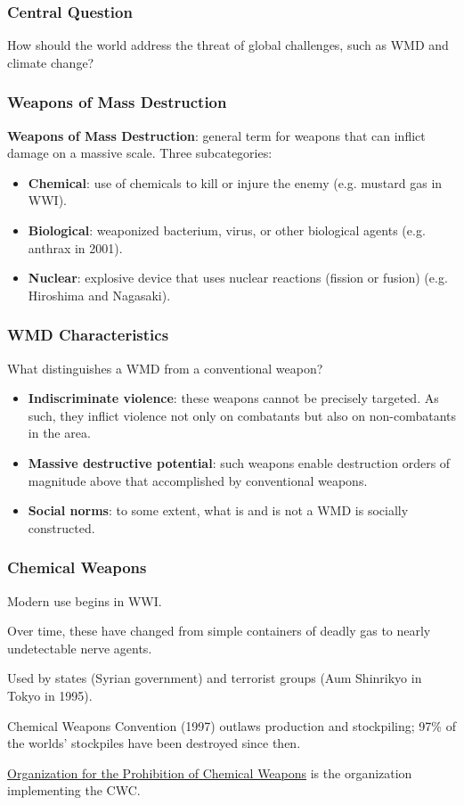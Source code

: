\documentclass{beamer}
\begin{document}
\begin{frame} 
\frametitle{\LARGE{Central Question}}
\centering
	\Large{How should the world address the threat of global challenges, such as WMD and climate change?}
	
\end{frame}


\begin{frame} 
\frametitle{\LARGE{Weapons of Mass Destruction}}
\textbf{Weapons of Mass Destruction}: general term for weapons that can inflict damage on a massive scale. Three subcategories: \pause
\begin{itemize}
		\item \textbf{Chemical}: use of chemicals to kill or injure the enemy (e.g. mustard gas in WWI). \pause
		\item \textbf{Biological}: weaponized bacterium, virus, or other biological agents (e.g. anthrax in 2001). \pause
		\item \textbf{Nuclear}: explosive device that uses nuclear reactions (fission or fusion) (e.g. Hiroshima and Nagasaki).
\end{itemize}
\end{frame}

\begin{frame} 
	\frametitle{\LARGE{WMD Characteristics}}
What distinguishes a WMD from a conventional weapon? \pause
	\begin{itemize}
		\item \textbf{Indiscriminate violence}: these weapons cannot be precisely targeted. As such, they inflict violence not only on combatants but also on non-combatants in the area. \pause
		\item \textbf{Massive destructive potential}: such weapons enable destruction orders of magnitude above that accomplished by conventional weapons. \pause
		\item \textbf{Social norms}: to some extent, what is and is not a WMD is socially constructed.
	\end{itemize}
\end{frame}

\begin{frame} 
\frametitle{\LARGE{Chemical Weapons}}
\begin{itemize}
	\large{
		\item Modern use begins in WWI. \pause
		\item Over time, these have changed from simple containers of deadly gas to nearly undetectable nerve agents. \pause
		\item Used by states (Syrian government) and terrorist groups (Aum Shinrikyo in Tokyo in 1995). \pause 
		\item Chemical Weapons Convention (1997) outlaws production and stockpiling; 97\% of the worlds' stockpiles have been destroyed since then. 
		\item \href{https://www.opcw.org/}{Organization for the Prohibition of Chemical Weapons} is the organization implementing the CWC.
	}
\end{itemize}
\end{frame}
\end{document}
